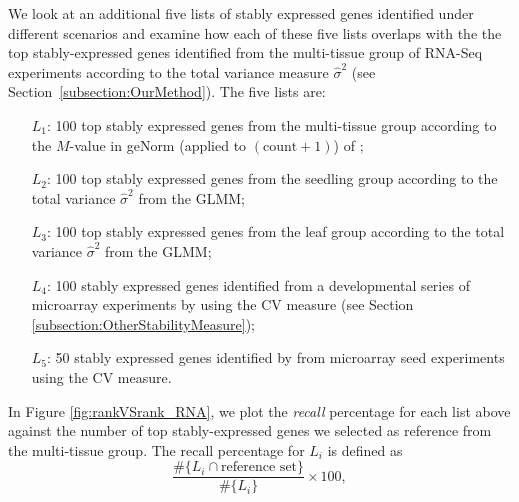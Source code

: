 \documentclass[letterpaper,12pt]{article}
\begin{document}
We look at an additional five lists of stably expressed genes identified under
different scenarios and examine how each of these five lists overlaps with the
the top stably-expressed genes identified from the multi-tissue group  of
RNA-Seq experiments  according to the total variance measure $\hat\sigma^2$
(see Section~\ref{subsection:OurMethod}). 
The five lists are: 
\begin{enumerate}\label{list:L5}
    \item[$L_1$:]
 100 top stably expressed genes from the multi-tissue group according
 to the $M$-value in geNorm (applied to $(\text{count}+1)$) of \cite{vandesompele2002accurate} ; 
\item[$L_2$:]	
100 top stably expressed genes from the seedling group according to the total variance $\hat\sigma^2$ from the GLMM;
\item[$L_3$:]
100 top stably expressed genes from the leaf group according to the total variance $\hat\sigma^2$ from the GLMM; 
\item[$L_4$:]
100 stably expressed genes identified from a developmental series of microarray
experiments by \cite{czechowski2005genome} using the CV measure (see Section \ref{subsection:OtherStabilityMeasure}); 
\item[$L_5$:] 50 stably expressed genes identified by \cite{dekkers2012identification} from microarray
seed experiments using the CV measure.  
\end{enumerate}
In Figure \ref{fig:rankVSrank_RNA}, we plot the {\em recall} percentage for
each list above against the number of top stably-expressed genes we selected
as reference from the multi-tissue group. 
The recall percentage for $L_i$ is defined as 
\begin{equation}\label{eq:recall}
\frac{ \#	 \{L_i \cap \text{reference set} \}}{\# \{L_i\}}\times 100,
\end{equation}
\end{document}
